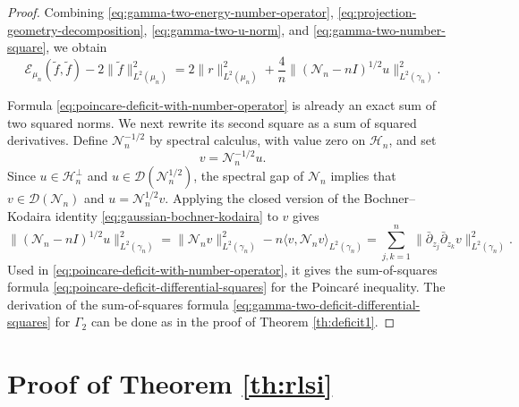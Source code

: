 \documentclass[11pt,reqno]{amsart}
\numberwithin{equation}{section}%
\numberwithin{figure}{section}%
\numberwithin{table}{section}
\theoremstyle{plain}
\theoremstyle{definition}
\begin{document}
\begin{proof}
  Combining \eqref{eq:gamma-two-energy-number-operator},
  \eqref{eq:projection-geometry-decomposition}, \eqref{eq:gamma-two-u-norm}, and
  \eqref{eq:gamma-two-number-square}, we obtain
  \begin{equation}\label{eq:poincare-deficit-with-number-operator}
    \mathcal{E}_{\mu_n}(\widetilde f,\widetilde f)
    -2\|\widetilde f\|_{L^2(\mu_n)}^2
    =2\|r\|_{L^2(\mu_n)}^2
    +\frac{4}{n}\|(\mathcal{N}_n-nI)^{1/2}u\|_{L^2(\gamma_n)}^2.
  \end{equation}

  Formula \eqref{eq:poincare-deficit-with-number-operator} is already an exact
  sum of two squared norms. We next rewrite its second square as a sum of
  squared derivatives. Define $\mathcal{N}_n^{-1/2}$ by spectral calculus,
  with value zero on $\mathcal{H}_n$, and set
  \begin{equation}\label{eq:gamma-two-pseudoinverse}
    v=\mathcal{N}_n^{-1/2}u.
  \end{equation}
  Since $u\in\mathcal{H}_n^\perp$ and $u\in\mathcal{D}(\mathcal{N}_n^{1/2})$,
  the spectral gap of $\mathcal{N}_n$ implies that
  $v\in\mathcal{D}(\mathcal{N}_n)$ and $u=\mathcal{N}_n^{1/2}v$. Applying the
  closed version of the Bochner--Kodaira identity
  \eqref{eq:gaussian-bochner-kodaira} to $v$ gives
  \begin{equation} \label{eq:gamma-two-second-derivative-square}
    \|(\mathcal{N}_n-nI)^{1/2}u\|_{L^2(\gamma_n)}^2 %
    = \|\mathcal{N}_nv\|_{L^2(\gamma_n)}^2 %
    - n\langle v,\mathcal{N}_nv\rangle_{L^2(\gamma_n)} %
    = \sum_{j,k=1}^n\|\bar\partial_{z_j}\bar\partial_{z_k}v\|_{L^2(\gamma_n)}^2.
  \end{equation}
  Used in \eqref{eq:poincare-deficit-with-number-operator}, it gives the
  sum-of-squares formula \eqref{eq:poincare-deficit-differential-squares} for
  the Poincaré inequality. The derivation of the sum-of-squares formula
  \eqref{eq:gamma-two-deficit-differential-squares} for $\Gamma_2$ can be done
  as in the proof of Theorem \ref{th:deficit1}.
\end{proof}

\section{Proof of Theorem \ref{th:rlsi}}
\label{se:proof:th:rlsi}
\end{document}
